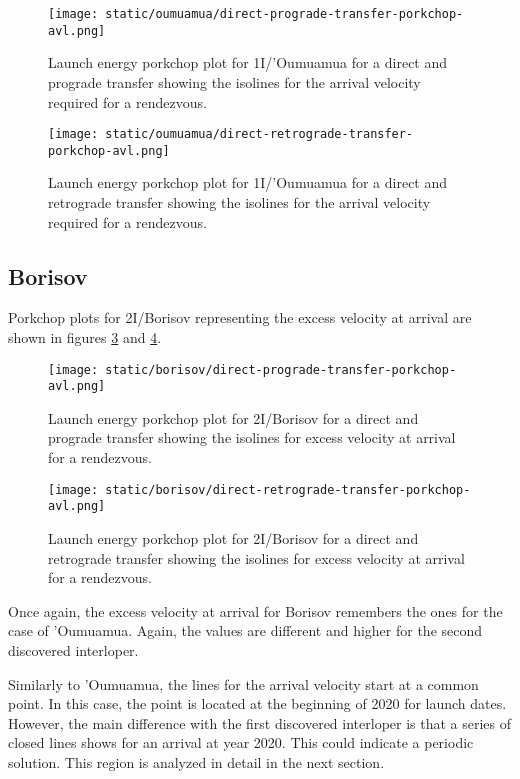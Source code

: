\newpage
\begin{figure}[H]
  \centering
  \texttt{[image: static/oumuamua/direct-prograde-transfer-porkchop-avl.png]}
        \caption[Direct and prograde launch energy porkchop for 'Oumuamua]{Launch energy porkchop plot for 1I/'Oumuamua for a direct and prograde transfer showing the isolines for the arrival velocity required for a rendezvous.}
  \label{fig:oumuamua-direct-prograde-transfer-porkchop-avl}
\end{figure}

\begin{figure}[H]
  \centering
  \texttt{[image: static/oumuamua/direct-retrograde-transfer-porkchop-avl.png]}
        \caption[Direct and prograde launch energy porkchop for
        'Oumuamua]{Launch energy porkchop plot for 1I/'Oumuamua for a direct and
        retrograde transfer showing the isolines for the arrival velocity required for a rendezvous.}
  \label{fig:oumuamua-direct-retrograde-transfer-porkchop-avl}
\end{figure}

\subsection{Borisov}

Porkchop plots for 2I/Borisov representing the excess velocity at arrival are
shown in figures \ref{fig:borisov-direct-prograde-transfer-porkchop-avl} and
\ref{fig:borisov-direct-retrograde-transfer-porkchop-avl}.

\begin{figure}[H]
  \centering
  \texttt{[image: static/borisov/direct-prograde-transfer-porkchop-avl.png]}
        \caption[Direct and prograde arrival excess velocity porkchop for
        Borisov]{Launch energy porkchop plot for 2I/Borisov for a direct and
        prograde transfer showing the isolines for excess velocity at arrival
        for a rendezvous.}
  \label{fig:borisov-direct-prograde-transfer-porkchop-avl}
\end{figure}

\begin{figure}[H]
  \centering
  \texttt{[image: static/borisov/direct-retrograde-transfer-porkchop-avl.png]}
        \caption[Direct and retrograde arrival excess velocity porkchop for
        Borisov]{Launch energy porkchop plot for 2I/Borisov for a direct and
        retrograde transfer showing the isolines for excess velocity at arrival
        for a rendezvous.}
  \label{fig:borisov-direct-retrograde-transfer-porkchop-avl}
\end{figure}

Once again, the excess velocity at arrival for Borisov remembers the ones for
the case of 'Oumuamua. Again, the values are different and higher for the second
discovered interloper.

Similarly to 'Oumuamua, the lines for the arrival velocity start at a common
point. In this case, the point is located at the beginning of 2020 for launch
dates. However, the main difference with the first discovered interloper is that
a series of closed lines shows for an arrival at year 2020. This could indicate
a periodic solution. This region is analyzed in detail in the next section.
